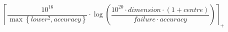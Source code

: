 \[\left\lceil \frac{10^{16}}{\max\left\{ lower^{2}, accuracy \right\}} \cdot \log\left(\frac{10^{20} \cdot dimension \cdot \left(1 + centre\right)}{failure \cdot accuracy}\right) \right\rceil_{+}\]
